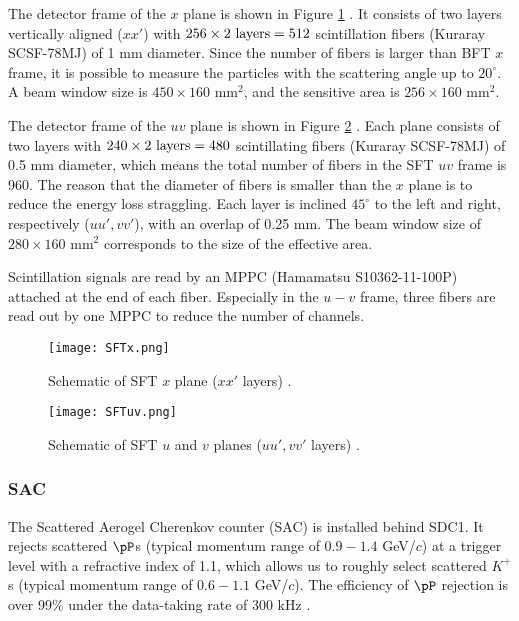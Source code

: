 The detector frame of the $x$ plane is shown in Figure \ref{fig-SFTx} \cite{Honda-D}. It consists of two layers vertically aligned ($xx'$) with $256\times2\ \rm{layers}=512$ scintillation fibers (Kuraray SCSF-78MJ) of 1 mm diameter. Since the number of fibers is larger than BFT $x$ frame, it is possible to measure the particles with the scattering angle up to $20^{\circ}$. A beam window size is $450\times160$ mm$^2$, and the sensitive area is $256\times160$ mm$^2$. 

The detector frame of the $uv$ plane is shown in Figure \ref{fig-SFTuv} \cite{Honda-D}. Each plane consists of two layers with $240\times2\ \rm{layers}=480$ scintillating fibers (Kuraray SCSF-78MJ) of 0.5 mm diameter, which means the total number of fibers in the SFT $uv$ frame is 960. The reason that the diameter of fibers is smaller than the $x$ plane is to reduce the energy loss straggling. Each layer is inclined $45^{\circ}$ to the left and right, respectively ($uu', vv'$), with an overlap of 0.25 mm. The beam window size of $280\times160$ mm$^2$ corresponds to the size of the effective area.

Scintillation signals are read by an MPPC (Hamamatsu S10362-11-100P) attached at the end of each fiber. Especially in the $u-v$ frame, three fibers are read out by one MPPC to reduce the number of channels. 

\begin{figure}[!h]
 \begin{center}
   \texttt{[image: SFTx.png]}
   \caption{Schematic of SFT $x$ plane ($xx'$ layers) \cite{Honda-D}.}
   \label{fig-SFTx}
 \end{center}
\end{figure}

\begin{figure}[!h]
 \begin{center}
   \texttt{[image: SFTuv.png]}
   \caption{Schematic of SFT $u$ and $v$ planes ($uu', vv'$ layers) \cite{Honda-D}.}
   \label{fig-SFTuv}
 \end{center}
\end{figure}


%
\subsubsection{SAC}
The Scattered Aerogel Cherenkov counter (SAC) is installed behind SDC1. It rejects scattered $\pP$s (typical momentum range of $0.9-1.4$ GeV/$c$) at a trigger level with a refractive index of 1.1, which allows us to roughly select scattered $K^+$s (typical momentum range of $0.6-1.1$ GeV/$c$). The efficiency of $\pP$ rejection is over 99\% under the data-taking rate of 300 kHz \cite{Koba-2016}. 


